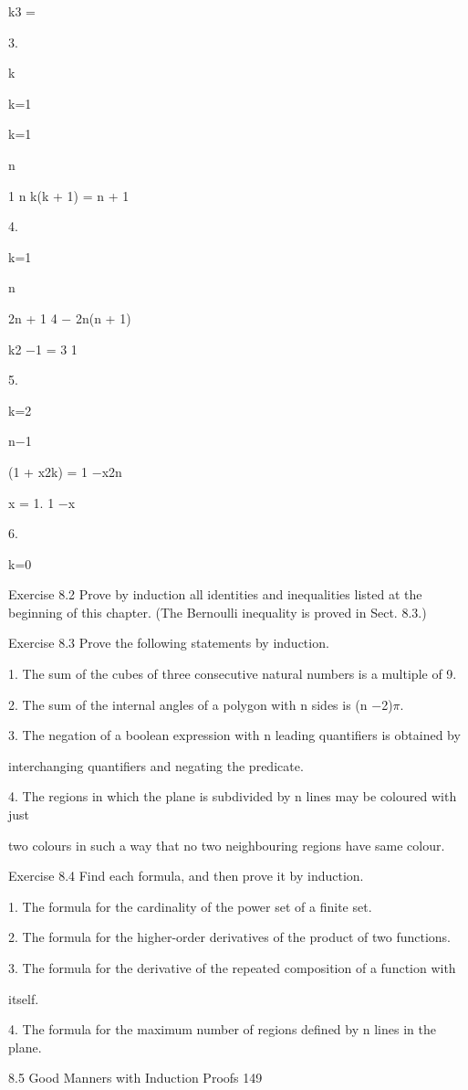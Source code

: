 \documentclass[11pt]{article}
\theoremstyle{plain}
\theoremstyle{definition}
\begin{document}
k3 =

3.

k

k=1

k=1

n

1 n k(k + 1) = n + 1

4.

k=1

n

2n + 1 4 $-$ 2n(n + 1)

k2 $-$1 = 3 1

5.

k=2

n$-$1

(1 + x2k) = 1 $-$x2n

x = 1. 1 $-$x

6.

k=0

Exercise 8.2 Prove by induction all identities and inequalities listed at the beginning of this chapter. (The Bernoulli inequality is proved in Sect. 8.3.)

Exercise 8.3 Prove the following statements by induction.

1. The sum of the cubes of three consecutive natural numbers is a multiple of 9.

2. The sum of the internal angles of a polygon with n sides is (n $-$2)$\pi$.

3. The negation of a boolean expression with n leading quantifiers is obtained by

interchanging quantifiers and negating the predicate.

4. The regions in which the plane is subdivided by n lines may be coloured with just

two colours in such a way that no two neighbouring regions have same colour.

Exercise 8.4 Find each formula, and then prove it by induction.

1. The formula for the cardinality of the power set of a finite set.

2. The formula for the higher-order derivatives of the product of two functions.

3. The formula for the derivative of the repeated composition of a function with

itself.

4. The formula for the maximum number of regions defined by n lines in the plane.

8.5 Good Manners with Induction Proofs 149
\end{document}
